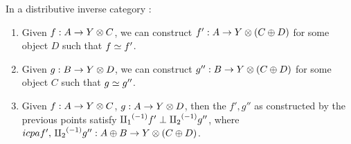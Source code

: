 \begin{lemma}\label{lem:maps_from_inverse_sums_have_disjoint_equivalences}
  In a distributive inverse category \X:
  \begin{enumerate}[{(}i{)}]
    \item Given $f : A \to Y\otimes C$, we can construct $f' : A \to Y \otimes (C\oplus D)$ for some object $D$ such
      that $f \overset{\scriptscriptstyle }{\simeq} f'$.
    \item Given $g : B \to Y\otimes D$, we can construct $g'' : B \to Y \otimes (C\oplus D)$ for some object $C$ such
      that $g \overset{\scriptscriptstyle }{\simeq} g''$.
    \item Given $f : A \to Y \otimes C$, $g : A\to Y \otimes D$, then the $f', g''$ as constructed by the
      previous points satisfy ${\amalg_{1}}^{(-1)} f' \perp {\amalg_{2}}^{(-1)} g''$, where $icpa f',\,{\amalg_{2}}^{(-1)} g'': A\oplus B \to Y\otimes(C\oplus D)$.
  \end{enumerate}
\end{lemma}

